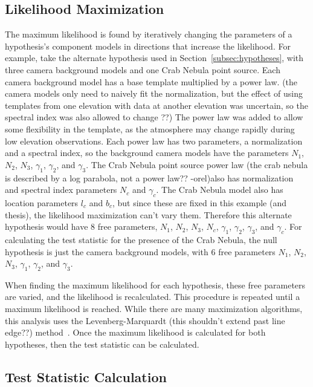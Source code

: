   \subsection{Likelihood Maximization}\label{subsec:likemax}
  The maximum likelihood is found by iteratively changing the parameters of a hypothesis's component models in directions that increase the likelihood.
  For example, take the alternate hypothesis used in Section~\ref{subsec:hypotheses}, with three camera background models and one Crab Nebula point source.
  Each camera background model has a base template multiplied by a power law.
  {\color{red}(the camera models only need to naively fit the normalization, but the effect of using templates from one elevation with data at another elevation was uncertain, so the spectral index was also allowed to change ??)}
  The power law was added to allow some flexibility in the template, as the atmosphere may change rapidly during low elevation observations.
  Each power law has two parameters, a normalization and a spectral index, so the background camera models have the parameters $N_1$, $N_2$, $N_3$, $\gamma_1$, $\gamma_2$, and $\gamma_3$.
  The Crab Nebula point source power law {\color{red}(the crab nebula is described by a log parabola, not a power law?? -orel)}also has normalization and spectral index parameters $N_c$ and $\gamma_c$.
  The Crab Nebula model also has location parameters $l_c$ and $b_c$, but since these are fixed in this example (and thesis), the likelihood maximization can't vary them.
  Therefore this alternate hypothesis would have 8 free parameters, $N_1$, $N_2$, $N_3$, $N_c$, $\gamma_1$, $\gamma_2$, $\gamma_3$, and $\gamma_c$.
  For calculating the test statistic for the presence of the Crab Nebula, the null hypothesis is just the camera background models, with 6 free parameters $N_1$, $N_2$, $N_3$, $\gamma_1$, $\gamma_2$, and $\gamma_3$.
  
  When finding the maximum likelihood for each hypothesis, these free parameters are varied, and the likelihood is recalculated.
  This procedure is repeated until a maximum likelihood is reached.
  While there are many maximization algorithms, this analysis uses the {\color{red}Levenberg-Marquardt (this shouldn't extend past line edge??)} method~\cite{marquardt1963algorithm}.
  Once the maximum likelihood is calculated for both hypotheses, then the test statistic can be calculated.
  
  \subsection{Test Statistic Calculation}
  
